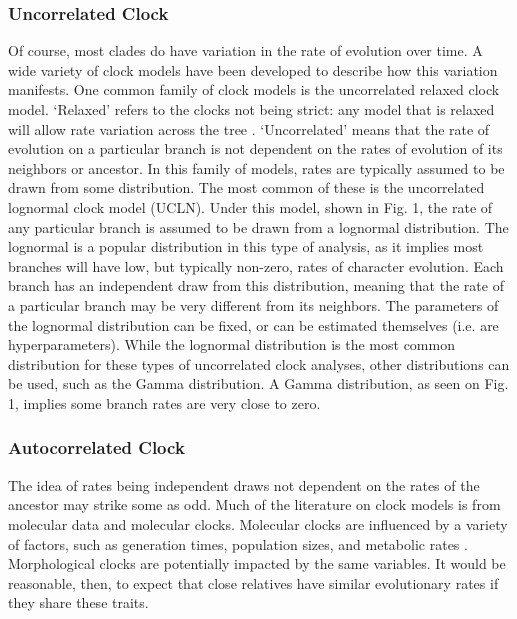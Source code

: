 \documentclass[11pt]{article}
\begin{document}
\subsubsection{Uncorrelated Clock}
Of course, most clades do have variation in the rate of evolution over time. 
A wide variety of clock models have been developed to describe how this variation manifests.
One common family of clock models is the uncorrelated relaxed clock model.
`Relaxed' refers to the clocks not being strict: any model that is relaxed will allow rate variation across the tree \cite{Drummond2006, Drummond2007}.
`Uncorrelated' means that the rate of evolution on a particular branch is not dependent on the rates of evolution of its neighbors or ancestor.
In this family of models, rates are typically assumed to be drawn from some distribution.
The most common of these is the uncorrelated lognormal clock model (UCLN).
Under this model, shown in Fig. 1, the rate of any particular branch is assumed to be drawn from a lognormal distribution.
The lognormal is a popular distribution in this type of analysis, as it implies most branches will have low, but typically non-zero, rates of character evolution. 
Each branch has an independent draw from this distribution, meaning that the rate of a particular branch may be very different from its neighbors.
The parameters of the lognormal distribution can be fixed, or can be estimated themselves (i.e. are hyperparameters).
While the lognormal distribution is the most common distribution for these types of uncorrelated clock analyses, other distributions can be used, such as the Gamma distribution.
A Gamma distribution, as seen on Fig. 1, implies some branch rates are very close to zero.



\subsubsection{Autocorrelated Clock}
The idea of rates being independent draws not dependent on the rates of the ancestor may strike some as odd. 
Much of the literature on clock models is from molecular data and molecular clocks.
Molecular clocks are influenced by a variety of factors, such as generation times, population sizes, and metabolic rates \cite{bromham1996, gaut1992}.
Morphological clocks are potentially impacted by the same variables. %
It would be reasonable, then, to expect that close relatives have similar evolutionary rates if they share these traits.
\end{document}
